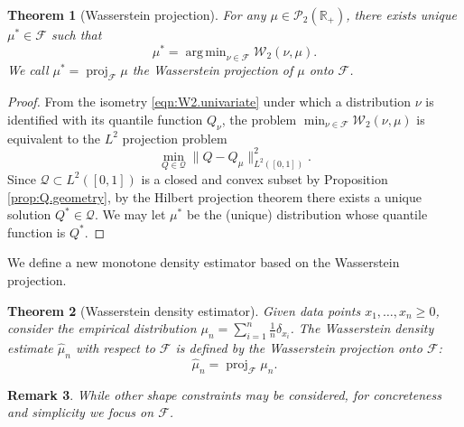 \documentclass{article}
\DeclareMathOperator*{\argmin}{arg\,min}
\DeclareMathOperator{\proj}{proj}
\newcommand{\bR}{\mathbb{R}}
\newcommand{\cF}{\mathcal{F}}
\newcommand{\cP}{\mathcal{P}}
\newcommand{\cQ}{\mathcal{Q}}
\newcommand{\W}{\mathcal{W}_2}
\numberwithin{equation}{section}
\newtheorem{theorem}{Theorem}[section]
\newtheorem{remark}[theorem]{Remark}
\begin{document}
\begin{theorem}[Wasserstein projection]
For any $\mu \in \cP_2(\bR_+)$, there exists unique $\mu^* \in \cF$ such that 
\begin{equation} \label{eqn:Wasserstein.projection}
\mu^* = \argmin_{\nu \in \cF} \W(\nu, \mu).
\end{equation}
We call $\mu^* = \proj_{\cF} \mu$ the Wasserstein projection of $\mu$ onto $\cF$.
\end{theorem}
\begin{proof}
From the isometry \eqref{eqn:W2.univariate} under which a distribution $\nu$ is identified with its quantile function $Q_{\nu}$, the problem $\min_{\nu \in \cF} \W(\nu, \mu)$ is equivalent to the $L^2$ projection problem
\begin{equation} \label{eqn:L2.projection}
\min_{Q \in \cQ} \|Q - Q_{\mu}\|_{L^2([0, 1])}^2.
\end{equation}
Since $\cQ \subset L^2([0, 1])$ is a closed and convex subset by Proposition \ref{prop:Q.geometry}, by the Hilbert projection theorem there exists a unique solution $Q^* \in \cQ$. We may let $\mu^*$ be the (unique) distribution whose quantile function is $Q^*$.
\end{proof}

We define a new monotone density estimator based on the Wasserstein projection.

\begin{theorem}[Wasserstein density estimator]
Given data points $x_1, \ldots, x_n \geq 0$, consider the empirical distribution $\mu_n = \sum_{i = 1}^n \frac{1}{n} \delta_{x_i}$. The Wasserstein density estimate $\hat{\mu}_n$ with respect to $\cF$ is defined by the Wasserstein projection onto $\cF$:
\begin{equation} \label{eqn:W2.estimator}
\hat{\mu}_n = \proj_{\cF} \mu_n.
\end{equation}
\end{theorem}

\begin{remark}
While other shape constraints may be considered, for concreteness and simplicity we focus on $\cF$.
\end{remark}
\end{document}
